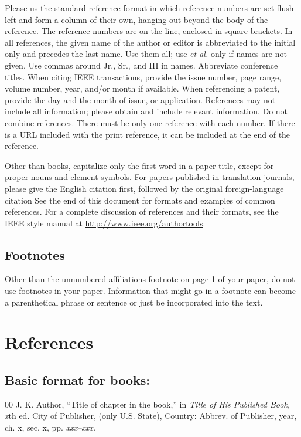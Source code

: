 \documentclass{IEEEtran}
\begin{document}
Please us the standard reference format in which
reference numbers are set flush left and form a column of their own, hanging
out beyond the body of the reference. The reference numbers are on the line,
enclosed in square brackets. In all references, the given name of the author
or editor is abbreviated to the initial only and precedes the last name. Use
them all; use \emph{et al.} only if names are not given. Use commas around Jr.,
Sr., and III in names. Abbreviate conference titles. When citing IEEE
transactions, provide the issue number, page range, volume number, year,
and/or month if available. When referencing a patent, provide the day and
the month of issue, or application. References may not include all
information; please obtain and include relevant information. Do not combine
references. There must be only one reference with each number. If there is a
URL included with the print reference, it can be included at the end of the
reference.

Other than books, capitalize only the first word in a paper title, except
for proper nouns and element symbols. For papers published in translation
journals, please give the English citation first, followed by the original
foreign-language citation See the end of this document for formats and
examples of common references. For a complete discussion of references and
their formats, see the IEEE style manual at
\underline{http://www.ieee.org/authortools}.

\subsection{Footnotes}
Other than the unnumbered affiliations footnote on page 1 of your paper, do
not use footnotes in your paper. Information that might go in a footnote can
become a parenthetical phrase or sentence or just be incorporated into the
text.

\section*{References}

\def\refname{\vadjust{\vspace*{-1em}}} %

\subsection*{Basic format for books:}

\begin{thebibliography}{00}
 J. K. Author, ``Title of chapter in the book,'' in \textit{Title of His Published Book, x}th ed. City of Publisher,
(only U.S. State), Country: Abbrev. of Publisher, year, ch. x, sec. x, pp.
\textit{xxx--xxx.}
\end{thebibliography}
\end{document}
